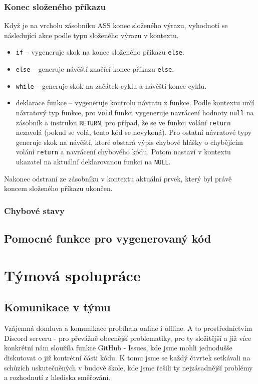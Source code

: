 \documentclass[a4paper, 12pt]{article}
\begin{document}
    \subsubsection{Konec složeného příkazu} \label{konec slozeneho}
    Když je na vrcholu zásobníku ASS konec složeného výrazu, vyhodnotí se následující akce podle typu složeného výrazu v kontextu.
    \begin{itemize}
        \item \texttt{if} -- vygeneruje skok na konec složeného příkazu \texttt{else}.
        \item \texttt{else} -- generuje návěští značící konec příkazu \texttt{else}.
        \item \texttt{while} -- generuje skok na začátek cyklu a návěští konce cyklu.
        \item deklarace funkce -- vygeneruje kontrolu návratu z funkce. Podle kontextu určí návratový typ funkce, pro \texttt{void} funkci vygeneruje navrácení hodnoty \texttt{null} na zásobník a instrukci \texttt{RETURN}, pro případ, že se ve funkci volání \texttt{return} nezavolá (pokud se volá, tento kód se nevykoná). Pro ostatní návratové typy generuje skok na návěští, které obstará výpis chybové hlášky o chybějícím volání \texttt{return} a navrácení chybového kódu. Potom nastaví v kontextu ukazatel na aktuální deklarovanou funkci na \texttt{NULL}.
    \end{itemize}

    Nakonec odstraní ze zásobníku v kontextu aktuální prvek, který byl právě koncem složeného příkazu ukončen.
    \subsubsection{Chybové stavy}

    \subsection{Pomocné funkce pro vygenerovaný kód} \label{pomocne}

    \section{Týmová spolupráce}
    \subsection{Komunikace v týmu}
        Vzájemná domluva a komunikace probíhala online i offline. A to prostřednictvím Discord serveru - pro převážně obecnější problematiky, pro ty složitější a již více konkrétní nám sloužila funkce GitHub - Issues, kde jsme mohli jednodušše diskutovat o již kontrétní části kódu. K tomu jsme se každý čtvrtek setkávali na schůzích uskutečněných v budově škole, kde jsme řešili ty nejzásadnější problémy a rozhodnutí z hlediska směřování.
\end{document}

